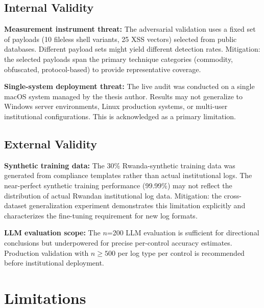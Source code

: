 \documentclass[12pt,oneside]{report}
\begin{document}
\subsection{Internal Validity}

\textbf{Measurement instrument threat:} The adversarial validation uses a fixed set of payloads (10 fileless shell variants, 25 XSS vectors) selected from public databases. Different payload sets might yield different detection rates. Mitigation: the selected payloads span the primary technique categories (commodity, obfuscated, protocol-based) to provide representative coverage.

\textbf{Single-system deployment threat:} The live audit was conducted on a single macOS system managed by the thesis author. Results may not generalize to Windows server environments, Linux production systems, or multi-user institutional configurations. This is acknowledged as a primary limitation.

\subsection{External Validity}

\textbf{Synthetic training data:} The 30\% Rwanda-synthetic training data was generated from compliance templates rather than actual institutional logs. The near-perfect synthetic training performance (99.99\%) may not reflect the distribution of actual Rwandan institutional log data. Mitigation: the cross-dataset generalization experiment demonstrates this limitation explicitly and characterizes the fine-tuning requirement for new log formats.

\textbf{LLM evaluation scope:} The $n$=200 LLM evaluation is sufficient for directional conclusions but underpowered for precise per-control accuracy estimates. Production validation with $n \geq 500$ per log type per control is recommended before institutional deployment.

\section{Limitations}
\end{document}
